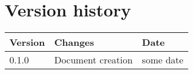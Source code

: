\chapter*{Version history}
\thispagestyle{empty}
\label{chap:versions}

\begin{tabular}{|m{}|m{}|m{}|} 
 \hline
 \textbf{Version} & \textbf{Changes} & \textbf{Date} \\ [0.5ex] 
 \hline
 0.1.0 & Document creation & some date  \\ 
 \hline
\end{tabular}